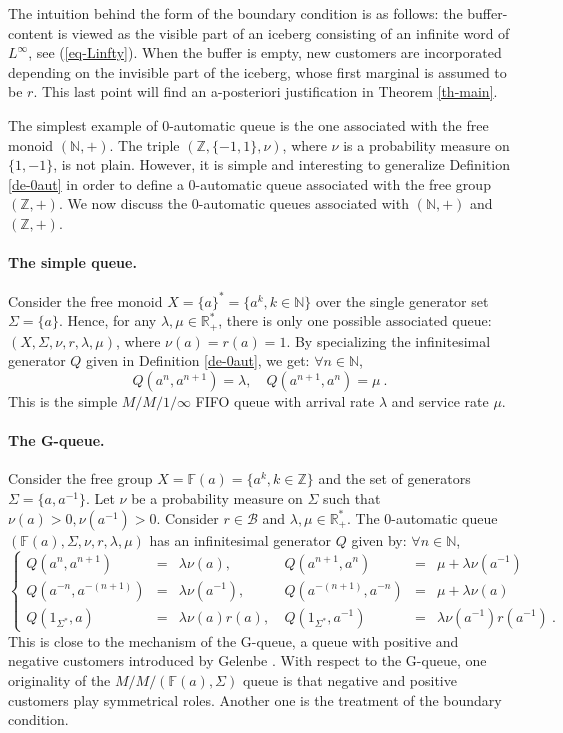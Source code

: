\documentclass[11pt,a4paper]{article}
\theoremstyle{remark}
\def\Blackboardfont{\mathbb}
\def\cb{\cB}
\def\F{{\Blackboardfont F}}
\def\Z{{\Blackboardfont Z}}
\def\N{{\Blackboardfont N}}
\def\R{{\Blackboardfont R}}
\def\cB{{\mathcal B}}
\def\eref#1{(\ref{#1})}
\begin{document}
\remark\label{rm-bc} The intuition behind the form of the boundary
condition is as follows: the buffer-content is viewed as the
visible part of an iceberg consisting of an infinite word of
$L^{\infty}$, see \eref{eq-Linfty}. When the buffer is empty, new
customers are incorporated depending on the invisible part of the
iceberg, whose first marginal is assumed to be $r$. This last
point will find an a-posteriori justification in Theorem
\ref{th-main}.

\medskip

The simplest example of 0-automatic queue is the one associated
with the free monoid $(\N,+)$. The triple $(\Z,\{-1,1\},\nu)$,
where $\nu$ is a probability measure on $\{1,-1\}$, is not plain.
However, it is simple and interesting to generalize Definition \ref{de-0aut}
in order to define a 0-automatic queue associated with the free
group $(\Z,+)$. We now discuss the 0-automatic queues associated with 
$(\N,+)$ and $(\Z,+)$. 

\paragraph{The simple queue.}

Consider the free monoid $X=\{a\}^*=\{a^k,k\in \N\}$ over the single
generator set
$\Sigma=\{a\}$.
Hence, for any $\lambda, \mu \in \R_+^*$, there is only one
possible associated queue: $(X,\Sigma, \nu,r,\lambda,\mu)$, where
$\nu(a)=r(a)=1$. By specializing the infinitesimal generator $Q$
given in Definition \ref{de-0aut}, we get: $\forall n \in \N$,
\[
Q(a^n,a^{n+1}) = \lambda, \quad Q(a^{n+1},a^{n}) = \mu \:.
\]
This is the simple $M/M/1/\infty$ FIFO queue with arrival rate
$\lambda$ and service rate $\mu$.

\paragraph{The G-queue.}

Consider the free group $X=\F(a)=\{a^k,k\in \Z\}$ and the
set of generators $\Sigma=\{a, a^{-1}\}$. Let $\nu$ be a probability
measure on
$\Sigma$ such that $\nu(a)>0, \nu(a^{-1})>0$. Consider $r\in \cb$ and $\lambda,
\mu \in
\R_+^*$. The 0-automatic queue
$(\F(a),\Sigma,\nu,r,\lambda,\mu)$ has an infinitesimal
generator $Q$ given by: $\forall n \in \N$,
\begin{equation*}
\left\{ \begin{array}{lcllcl}
Q(a^n,a^{n+1}) & = &  \lambda \nu(a), & \ Q(a^{n+1}, a^n) & = &   \mu +
\lambda\nu(a^{-1}) \\
Q(a^{-n}, a^{-(n+1)}) & = &    \lambda\nu(a^{-1}),  &  \ Q(a^{-(n+1)},
a^{-n}) & = & \mu + \lambda\nu(a) \\
Q(1_{\Sigma^*},a) & = &   \lambda \nu(a)r(a), & \ Q(1_{\Sigma^*},a^{-1}) & = &
\lambda
\nu(a^{-1})r(a^{-1}) \:.
\end{array}\right.
\end{equation*}
This is close to the mechanism of the G-queue, a queue with positive and
negative customers introduced by Gelenbe \cite{gele91,GePu}.
With respect to the G-queue, one originality of the
$M/M/(\F(a),\Sigma)$ queue is that negative and
positive customers play
symmetrical roles. Another one is the treatment of the boundary
condition. 
\end{document}
